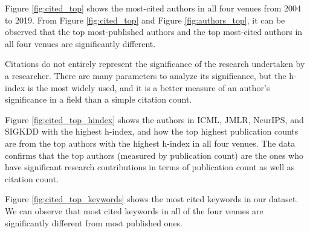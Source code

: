 Figure \ref{fig:cited_top} shows the most-cited authors in all four venues from 2004 to 2019. From Figure \ref{fig:cited_top} and Figure \ref{fig:authors_top}, it can be observed that the top most-published authors and the top most-cited authors in all four venues are significantly different. 

Citations do not entirely represent the significance of the research undertaken by a researcher. There are many parameters to analyze its significance, but the h-index is the most widely used, and it is a better measure of an author's significance in a field than a simple citation count. 

Figure \ref{fig:cited_top_hindex} shows the authors in ICML, JMLR, NeurIPS, and SIGKDD with the highest h-index, and how the top highest publication counts are from the top authors with the highest h-index in all four venues. The data confirms that the top authors (measured by publication count) are the ones who have significant research contributions in terms of publication count as well as citation count.

Figure \ref{fig:cited_top_keywords} shows the most cited keywords in our dataset. We can observe that most cited keywords in all of the four venues are significantly different from most published ones.


